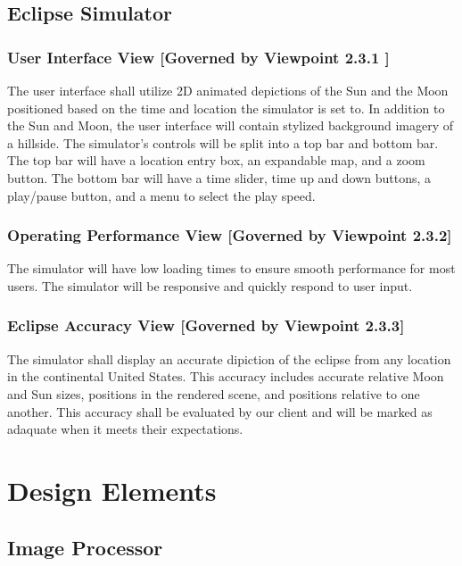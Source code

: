 \documentclass[10pt, onecolumn, draftclsnofoot, letterpaper, compsoc]{IEEEtran}
\begin{document}
\subsection{Eclipse Simulator}

  \subsubsection{User Interface View [Governed by Viewpoint 2.3.1 ]}
  The user interface shall utilize 2D animated depictions of
  the Sun and the Moon positioned based on the time and location the simulator
  is set to. In addition to the Sun and Moon, the user interface will contain
  stylized background imagery of a hillside. The simulator's controls will be
  split into a top bar and bottom bar. The top bar will have a location entry
  box, an expandable map, and a zoom button. The bottom bar will have a time
  slider, time up and down buttons, a play/pause button, and a menu to select
  the play speed.  \\

  \subsubsection{Operating Performance View [Governed by Viewpoint 2.3.2]}
  The simulator will have low loading times to ensure smooth performance
  for most users. The simulator will be responsive and quickly respond to
  user input. \\

  \subsubsection{Eclipse Accuracy View [Governed by Viewpoint 2.3.3]}
  The simulator shall display an accurate dipiction of the eclipse from
  any location in the continental United States. This accuracy includes
  accurate relative Moon and Sun sizes, positions in the rendered scene,
  and positions relative to one another. This accuracy shall be evaluated
  by our client and will be marked as adaquate when it meets their expectations. \\

\section{Design Elements}

\subsection{Image Processor}
\end{document}
